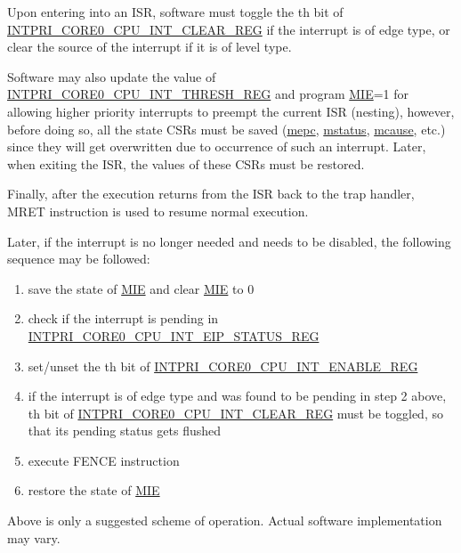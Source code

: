 \documentclass[main\_\_EN.tex]{subfiles}
\begin{document}
Upon entering into an ISR, software must toggle the th bit of \hyperref[regdesc:INTPRICORE0CPUINTCLEARREG]{INTPRI\_CORE0\_CPU\_INT\_CLEAR\_REG} if the interrupt is of edge type, or clear the source of the interrupt if it is of level type.

Software may also update the value of \hyperref[regdesc:INTPRICORE0CPUINTTHRESHREG]{INTPRI\_CORE0\_CPU\_INT\_THRESH\_REG} and program \hyperref[fielddesc:MSTATUSMIE]{MIE}=1 for allowing higher priority interrupts to preempt the current ISR (nesting), however, before doing so, all the state CSRs must be saved (\hyperref[regdesc:MEPC]{mepc}, \hyperref[regdesc:MSTATUS]{mstatus}, \hyperref[regdesc:MCAUSE]{mcause}, etc.) since they will get overwritten due to occurrence of such an interrupt. Later, when exiting the ISR, the values of these CSRs must be restored.

Finally, after the execution returns from the ISR back to the trap handler, MRET instruction is used to resume normal execution.

Later, if the  interrupt is no longer needed and needs to be disabled, the following sequence may be followed:
\begin{enumerate}
    \item save the state of \hyperref[fielddesc:MSTATUSMIE]{MIE} and clear \hyperref[fielddesc:MSTATUSMIE]{MIE} to 0
    \item check if the interrupt is pending in \hyperref[regdesc:INTPRICORE0CPUINTEIPSTATUSREG]{INTPRI\_CORE0\_CPU\_INT\_EIP\_STATUS\_REG}
    \item set/unset the th bit of \hyperref[regdesc:INTPRICORE0CPUINTENABLEREG]{INTPRI\_CORE0\_CPU\_INT\_ENABLE\_REG}
    \item if the interrupt is of edge type and was found to be pending in step 2 above, th bit of \hyperref[regdesc:INTPRICORE0CPUINTCLEARREG]{INTPRI\_CORE0\_CPU\_INT\_CLEAR\_REG} must be toggled, so that its pending status gets flushed
    \item execute FENCE instruction
    \item restore the state of \hyperref[fielddesc:MSTATUSMIE]{MIE}
\end{enumerate}

Above is only a suggested scheme of operation. Actual software implementation may vary.


\hypertarget{riscvcpu-int-reg-summ}{}
\end{document}
